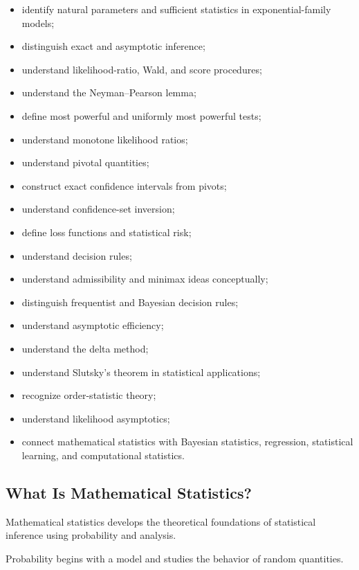 {\begin{itemize}
    \item identify natural parameters and sufficient statistics in
          exponential-family models;
    \item distinguish exact and asymptotic inference;
    \item understand likelihood-ratio, Wald, and score procedures;
    \item understand the Neyman--Pearson lemma;
    \item define most powerful and uniformly most powerful tests;
    \item understand monotone likelihood ratios;
    \item understand pivotal quantities;
    \item construct exact confidence intervals from pivots;
    \item understand confidence-set inversion;
    \item define loss functions and statistical risk;
    \item understand decision rules;
    \item understand admissibility and minimax ideas conceptually;
    \item distinguish frequentist and Bayesian decision rules;
    \item understand asymptotic efficiency;
    \item understand the delta method;
    \item understand Slutsky's theorem in statistical applications;
    \item recognize order-statistic theory;
    \item understand likelihood asymptotics;
    \item connect mathematical statistics with Bayesian statistics,
          regression, statistical learning, and computational statistics.
\end{itemize}
}

\subsection{What Is Mathematical Statistics?}
\label{subsec:what-is-mathematical-statistics}

Mathematical statistics develops the theoretical foundations of
statistical inference using probability and analysis.

Probability begins with a model and studies the behavior of random
quantities.


